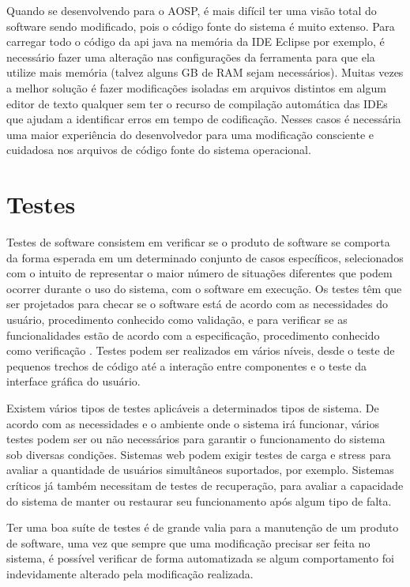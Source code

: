 Quando se desenvolvendo para o AOSP, é mais difícil ter uma visão total do software sendo modificado, pois o código fonte do sistema é muito extenso. Para carregar todo o código da api java na memória da IDE Eclipse por exemplo, é necessário fazer uma alteração nas configurações da ferramenta para que ela utilize mais memória (talvez alguns GB de RAM sejam necessários). Muitas vezes a melhor solução é fazer modificações isoladas em arquivos distintos em algum editor de texto qualquer sem ter o recurso de compilação automática das IDEs que ajudam a identificar erros em tempo de codificação. Nesses casos é necessária uma maior experiência do desenvolvedor para uma modificação consciente e cuidadosa nos arquivos de código fonte do sistema operacional.

\section{Testes}

Testes de software consistem em verificar se o produto de software se comporta da forma esperada em um determinado conjunto de casos específicos, selecionados com o intuito de representar o maior número de situações diferentes que podem ocorrer durante o uso do sistema, com o software em execução. Os testes têm que ser projetados para checar se o software está de acordo com as necessidades do usuário, procedimento conhecido como validação, e para verificar se as funcionalidades estão de acordo com a especificação, procedimento conhecido como verificação \cite{swebok}. Testes podem ser realizados em vários níveis, desde o teste de pequenos trechos de código até a interação entre componentes e o teste da interface gráfica do usuário.

Existem vários tipos de testes aplicáveis a determinados tipos de sistema. De acordo com as necessidades e o ambiente onde o sistema irá funcionar, vários testes podem ser ou não necessários para garantir o funcionamento do sistema sob diversas condições. Sistemas web podem exigir testes de carga e stress para avaliar a quantidade de usuários simultâneos suportados, por exemplo. Sistemas críticos já também necessitam de testes de recuperação, para avaliar a capacidade do sistema de manter ou restaurar seu funcionamento após algum tipo de falta.

Ter uma boa suíte de testes é de grande valia para a manutenção de um produto de software, uma vez que sempre que uma modificação precisar ser feita no sistema, é possível verificar de forma automatizada se algum comportamento foi indevidamente alterado pela modificação realizada.

